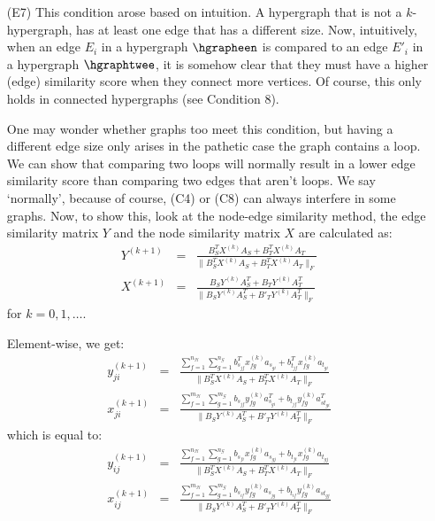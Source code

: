 \documentclass[a4paper,11pt]{report}
\newtheorem{remark}[theorem]{Remark}
\newcommand{\graf}{\mathscr{G}}
\newcommand{\grafeen}{\mathscr{H}}
\begin{document}
\begin{itemize}
\begin{remark}
 
  \end{remark}

 
  \item[(E7)] This condition arose based on intuition. A hypergraph that is not a $k$-hypergraph,
  has at least one edge that has a different size. Now, intuitively, when an edge 
   $E_i$ in a hypergraph $\hgrapheen$ is compared to an edge $E'_i$ in a hypergraph 
  $\hgraphtwee$, it is somehow clear that they must have a higher (edge) similarity score 
  when they connect more vertices. Of course,
  this only holds in connected hypergraphs (see Condition 8).  
  
One may wonder whether graphs too meet this condition, but having a different edge size only 
arises in the pathetic case the graph contains a loop. We can show that comparing two loops will normally result
in a lower edge similarity score than comparing two edges that aren't loops. We say `normally', because of course, (C4) or (C8) can always
interfere in some graphs. Now, to show this, look at the 
node-edge similarity method, the edge similarity matrix $Y$ and the node 
similarity matrix $X$ are calculated as:
\begin{eqnarray}
  Y^{(k+1)} &=& \frac{B_S^TX^{(k)}A_S + B_T^TX^{(k)}A_T}{\|B_S^TX^{(k)}A_S + 
  B_T^TX^{(k)}A_T\|_F}\\
   X^{(k+1)} &=& \frac{B_SY^{(k)}A_S^T + B_TY^{(k)}A^T_T}{\|B_SY^{(k)}A_S^T + 
   B'_TY^{(k)}A^T_T\|_F} \end{eqnarray}
  for  $k =  0,1,\ldots$.
  
 Element-wise, we get:
  \begin{eqnarray*}
  y^{(k+1)}_{ji} &=& \frac{\sum^{n_\grafeen}_{f=1}\sum^{n_\graf}_{g=1} b_{s_{jf}}^Tx_{fg}^{(k)}a_{s_{gi}} + b_{t_{jf}}^Tx_{fg}^{(k)}a_{t_{gi}}}{\|B_S^TX^{(k)}A_S + 
  B_T^TX^{(k)}A_T\|_F}\\
   x^{(k+1)}_{ji} &=& \frac{\sum^{m_\grafeen}_{f=1}\sum^{m_\graf}_{g=1} b_{s_{jf}}y_{fg}^{(k)}a_{s_{gi}}^T + b_{t_{jf}}y_{fg}^{(k)}a_{st_{gi}}^T}{\|B_SY^{(k)}A_S^T + 
   B'_TY^{(k)}A^T_T\|_F}
 \end{eqnarray*}
 which is equal to:
  \begin{eqnarray*}
  y^{(k+1)}_{ij} &=& \frac{\sum^{n_\grafeen}_{f=1}\sum^{n_\graf}_{g=1} b_{s_{fi}}x_{fg}^{(k)}a_{s_{gj}} + b_{t_{fi}}x_{fg}^{(k)}a_{t_{gj}}}{\|B_S^TX^{(k)}A_S + 
  B_T^TX^{(k)}A_T\|_F}\\
   x^{(k+1)}_{ij} &=& \frac{\sum^{m_\grafeen}_{f=1}\sum^{m_\graf}_{g=1} b_{s_{if}}y_{fg}^{(k)}a_{s_{jg}} + b_{t_{if}}y_{fg}^{(k)}a_{st_{gj}}}{\|B_SY^{(k)}A_S^T + 
   B'_TY^{(k)}A^T_T\|_F}
 \end{eqnarray*}
  

\end{itemize}
\end{document}
